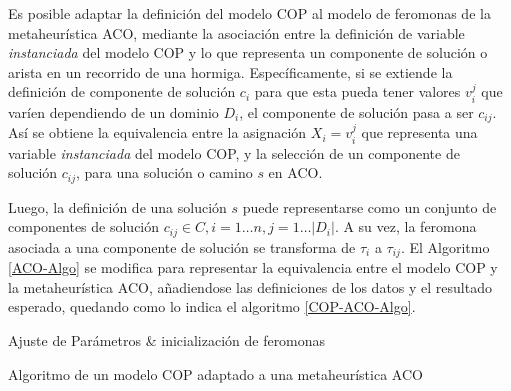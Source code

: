 Es posible adaptar la definici\'on del modelo COP al modelo de feromonas de la metaheur\'istica ACO, mediante la asociaci\'on entre la definici\'on de variable {\it instanciada} del modelo COP y lo que representa un componente de soluci\'on o arista en un recorrido de una hormiga. 
Espec\'ificamente, si se extiende la definici\'on de componente de soluci\'on $c_{i}$ para que esta pueda tener valores $v_{i}^{j}$ que var\'ien dependiendo de un dominio $D_i$, el componente de soluci\'on pasa a ser $c_{ij}$. As\'i se obtiene la equivalencia entre la asignaci\'on $X_i = v_{i}^{j}$ que representa una variable {\it instanciada} del modelo COP, y la selecci\'on de un componente de soluci\'on $c_{ij}$,  para una soluci\'on o camino $s$ en ACO\cite{socha2008ant}.


Luego, la definici\'on de una soluci\'on $s$ puede representarse como un conjunto de componentes de soluci\'on $c_{ij} \in C, i = 1 \dotsc n, j = 1 \dotsc |D_i|$. A su vez, la feromona asociada a una componente de soluci\'on se transforma de $\tau_i$ a $\tau_{ij}$. El Algoritmo  \ref{ACO-Algo} se modifica para representar la equivalencia entre el modelo COP y la metaheur\'istica ACO, a\~nadiendose las definiciones de los datos y el resultado esperado, quedando como lo indica el algoritmo \ref{COP-ACO-Algo}. 


\begin{algorithm}[H]
\SetAlgoLined
{}
 Ajuste de Par\'ametros \& inicializaci\'on de feromonas \;
 \caption{Algoritmo de un modelo COP adaptado a una metaheur\'istica ACO}\label{COP-ACO-Algo}
\end{algorithm}